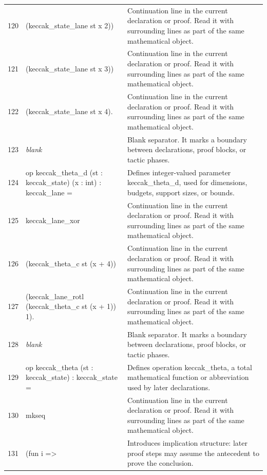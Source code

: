 \documentclass[10pt]{article}
\begin{document}
\begin{longtable}{r L{0.53\textwidth} L{0.37\textwidth}}
120 & {\ttfamily\scriptsize         (keccak\_state\_lane st x 2))} & Continuation line in the current declaration or proof.  Read it with surrounding lines as part of the same mathematical object. \\
121 & {\ttfamily\scriptsize       (keccak\_state\_lane st x 3))} & Continuation line in the current declaration or proof.  Read it with surrounding lines as part of the same mathematical object. \\
122 & {\ttfamily\scriptsize     (keccak\_state\_lane st x 4).} & Continuation line in the current declaration or proof.  Read it with surrounding lines as part of the same mathematical object. \\
123 & {\ttfamily\scriptsize \emph{blank}} & Blank separator.  It marks a boundary between declarations, proof blocks, or tactic phases. \\
124 & {\ttfamily\scriptsize op keccak\_theta\_d (st : keccak\_state) (x : int) : keccak\_lane =} & Defines integer-valued parameter keccak\_theta\_d, used for dimensions, budgets, support sizes, or bounds. \\
125 & {\ttfamily\scriptsize   keccak\_lane\_xor} & Continuation line in the current declaration or proof.  Read it with surrounding lines as part of the same mathematical object. \\
126 & {\ttfamily\scriptsize     (keccak\_theta\_c st (x + 4))} & Continuation line in the current declaration or proof.  Read it with surrounding lines as part of the same mathematical object. \\
127 & {\ttfamily\scriptsize     (keccak\_lane\_rotl (keccak\_theta\_c st (x + 1)) 1).} & Continuation line in the current declaration or proof.  Read it with surrounding lines as part of the same mathematical object. \\
128 & {\ttfamily\scriptsize \emph{blank}} & Blank separator.  It marks a boundary between declarations, proof blocks, or tactic phases. \\
129 & {\ttfamily\scriptsize op keccak\_theta (st : keccak\_state) : keccak\_state =} & Defines operation keccak\_theta, a total mathematical function or abbreviation used by later declarations. \\
130 & {\ttfamily\scriptsize   mkseq} & Continuation line in the current declaration or proof.  Read it with surrounding lines as part of the same mathematical object. \\
131 & {\ttfamily\scriptsize     (fun i =>} & Introduces implication structure: later proof steps may assume the antecedent to prove the conclusion. \\

\end{longtable}
\end{document}
